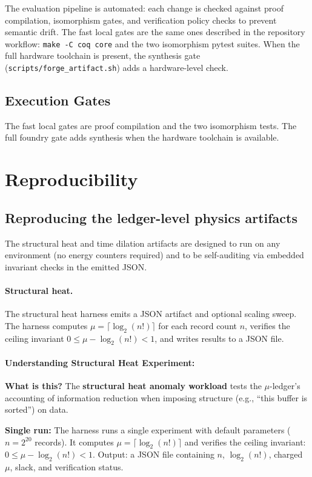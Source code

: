The evaluation pipeline is automated: each change is checked against proof compilation, isomorphism gates, and verification policy checks to prevent semantic drift.
The fast local gates are the same ones described in the repository workflow: \texttt{make -C coq core} and the two isomorphism pytest suites. When the full hardware toolchain is present, the synthesis gate (\texttt{scripts/forge\_artifact.sh}) adds a hardware-level check.

\subsection{Execution Gates}

The fast local gates are proof compilation and the two isomorphism tests. The full foundry gate adds synthesis when the hardware toolchain is available.

\section{Reproducibility}

\subsection{Reproducing the ledger-level physics artifacts}
The structural heat and time dilation artifacts are designed to run on any environment (no energy counters required) and to be self-auditing via embedded invariant checks in the emitted JSON.

\paragraph{Structural heat.} The structural heat harness emits a JSON artifact and optional scaling sweep. The harness computes $\mu = \lceil \log_2(n!) \rceil$ for each record count $n$, verifies the ceiling invariant $0 \leq \mu - \log_2(n!) < 1$, and writes results to a JSON file.

\paragraph{Understanding Structural Heat Experiment:}

\textbf{What is this?} The \textbf{structural heat anomaly workload} tests the $\mu$-ledger's accounting of information reduction when imposing structure (e.g., ``this buffer is sorted'') on data.

\textbf{Single run:} The harness runs a single experiment with default parameters ($n = 2^{20}$ records). It computes $\mu = \lceil \log_2(n!) \rceil$ and verifies the ceiling invariant: $0 \leq \mu - \log_2(n!) < 1$. Output: a JSON file containing $n$, $\log_2(n!)$, charged $\mu$, slack, and verification status.

